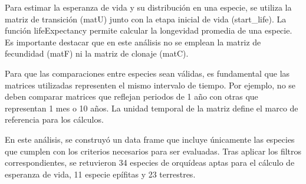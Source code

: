 \documentclass[
  12pt,
  letterpaper,
]{book}
\begin{document}
Para estimar la esperanza de vida y su distribución en una especie, se
utiliza la matriz de transición (matU) junto con la etapa inicial de
vida (start\_life). La función lifeExpectancy permite calcular la
longevidad promedia de una especie. Es importante destacar que en este
análisis no se emplean la matriz de fecundidad (matF) ni la matriz de
clonaje (matC).

Para que las comparaciones entre especies sean válidas, es fundamental
que las matrices utilizadas representen el mismo intervalo de tiempo.
Por ejemplo, no se deben comparar matrices que reflejan periodos de 1
año con otras que representan 1 mes o 10 años. La unidad temporal de la
matriz define el marco de referencia para los cálculos.

En este análisis, se construyó un data frame que incluye únicamente las
especies que cumplen con los criterios necesarios para ser evaluadas.
Tras aplicar los filtros correspondientes, se retuvieron 34 especies de
orquídeas aptas para el cálculo de esperanza de vida, 11 especie
epífitas y 23 terrestres.
\end{document}
